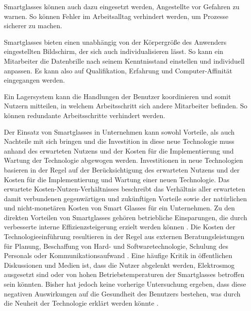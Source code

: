 Smartglasses können auch dazu eingesetzt werden, Angestellte vor Gefahren zu warnen. So können Fehler im Arbeitsalltag verhindert werden, um Prozesse sicherer zu machen. 

Smartglasses bieten einen unabhängig von der Körpergröße des Anwenders eingestellten Bildschirm, der sich auch individualisieren lässt. So kann ein Mitarbeiter die Datenbrille nach seinem Kenntnisstand einstellen und individuell anpassen. Es kann also auf Qualifikation, Erfahrung und Computer-Affinität eingegangen werden.

Ein Lagersystem kann die Handlungen der Benutzer koordinieren und somit Nutzern mitteilen, in welchem Arbeitsschritt sich andere Mitarbeiter befinden. So können redundante Arbeitsschritte verhindert werden. 

Der Einsatz von Smartglasses in Unternehmen kann sowohl Vorteile, als auch Nachteile mit sich bringen und die Investition in diese neue Technologie muss anhand des erwarteten Nutzens und der Kosten für die Implementierung und Wartung der Technologie abgewogen werden. Investitionen in neue Technologien basieren in der Regel auf der Berücksichtigung des erwarteten Nutzens und der Kosten für die Implementierung und Wartung einer neuen Technologie. Das erwartete Kosten-Nutzen-Verhältnisses beschreibt das Verhältnis aller erwarteten damit verbundenen gegenwärtigen und zukünftigen Vorteile sowie der natürlichen und nicht-monetären Kosten von Smart Glasses für ein Unternehmen. Zu den direkten Vorteilen von Smartglasses gehören betriebliche Einsparungen, die durch verbesserte interne Effizienzsteigerung erzielt werden können \cite{Hein2016}.
Die Kosten der Technologieeinführung resultieren in der Regel aus externen Beratungsleistungen für Planung, Beschaffung von Hard- und Softwaretechnologie, Schulung des Personals oder Kommunikationsaufwand \cite{Hein2016}. Eine häufige Kritik in öffentlichen Diskussionen und Medien ist, dass die Nutzer abgelenkt werden, Elektrosmog ausgesetzt sind oder von hohen Betriebstemperaturen der Smartglasses betroffen sein könnten. Bisher hat jedoch keine vorherige Untersuchung ergeben, dass diese negativen Auswirkungen auf die Gesundheit des Benutzers bestehen, was durch die Neuheit der Technologie erklärt werden könnte \cite{Hein2016}.
%
%
%
%
%
